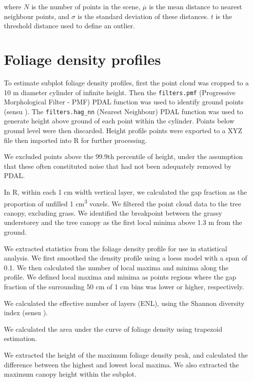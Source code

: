 \documentclass[11pt,a4paper]{article}
\begin{document}
where $N$ is the number of points in the scene, $\overline{\mu}$ is the mean distance to nearest neighbour points, and $\sigma$ is the standard deviation of these distances. $t$ is the threshold distance used to define an outlier.

\section{Foliage density profiles}

To estimate subplot foliage density profiles, first the point cloud was cropped to a 10 m diameter cylinder of infinite height. Then the \texttt{filters.pmf} (Progressive Morphological Filter - PMF) PDAL function was used to identify ground points (sensu \citealt{Zhang2003}). The \texttt{filters.hag\_nn} (Nearest Neighbour) PDAL function was used to generate height above ground of each point within the cylinder. Points below ground level were then discarded. Height profile points were exported to a XYZ file then imported into R for further processing. 

We excluded points above the 99.9th percentile of height, under the assumption that these often constituted noise that had not been adequately removed by PDAL.

In R, within each 1 cm width vertical layer, we calculated the gap fraction as the proportion of unfilled 1 cm\textsuperscript{3} voxels. We filtered the point cloud data to the tree canopy, excluding grass. We identified the breakpoint between the grassy understorey and the tree canopy as the first local minima above 1.3 m from the ground. 

We extracted statistics from the foliage density profile for use in statistical analysis. We first smoothed the density profile using a loess model with a span of 0.1. We then calculated the number of local maxima and minima along the profile. We defined local maxima and minima as points regions where the gap fraction of the surrounding 50 cm of 1 cm bins was lower or higher, respectively.

We calculated the effective number of layers (ENL), using the Shannon diversity index (sensu \citep{Ehbrecht2016}). 

We calculated the area under the curve of foliage density using trapezoid estimation.

We extracted the height of the maximum foliage density peak, and calculated the difference between the highest and lowest local maxima. We also extracted the maximum canopy height within the subplot.
\end{document}
